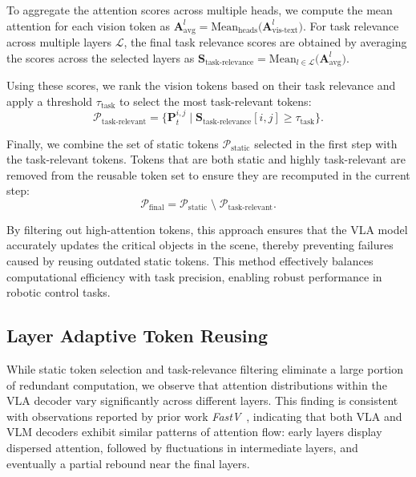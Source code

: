 To aggregate the attention scores across multiple heads, we compute the mean attention for each vision token as $\mathbf{A}^l_{\text{avg}} 
= \mathrm{Mean}_{\text{heads}}\!\bigl(\mathbf{A}^l_{\text{vis-text}}\bigr)$. For task relevance across multiple layers \( \mathcal{L} \), the final task relevance scores are obtained by averaging the scores across the selected layers as $\mathbf{S}_{\text{task-relevance}} 
= \mathrm{Mean}_{l \in \mathcal{L}}\!\bigl(\mathbf{A}^l_{\text{avg}}\bigr)$.

Using these scores, we rank the vision tokens based on their task relevance and apply a threshold \( \tau_{\text{task}} \) to select the most task-relevant tokens:
\begin{equation}
\label{eq:ptask}
\mathcal{P}_{\text{task-relevant}} 
= \{ \mathbf{P}_t^{i,j} \mid \mathbf{S}_{\text{task-relevance}}[i,j] \geq \tau_{\text{task}} \}.
\end{equation}

Finally, we combine the set of static tokens \( \mathcal{P}_{\mathrm{static}} \) selected in the first step with the task-relevant tokens. Tokens that are both static and highly task-relevant are removed from the reusable token set to ensure they are recomputed in the current step:
\begin{equation}
\label{eq:pfinal}
\mathcal{P}_{\mathrm{final}} 
= \mathcal{P}_{\mathrm{static}} \;\setminus\; \mathcal{P}_{\text{task-relevant}}.
\end{equation}

By filtering out high-attention tokens, this approach ensures that the VLA model accurately updates the critical objects in the scene, thereby preventing failures caused by reusing outdated static tokens. This method effectively balances computational efficiency with task precision, enabling robust performance in robotic control tasks.

\subsection{Layer Adaptive Token Reusing}
While static token selection and task-relevance filtering eliminate a large portion of redundant computation, we observe that attention distributions within the VLA decoder vary significantly across different layers. This finding is consistent with observations reported by prior work \textit{FastV}~\cite{chen2025image}, indicating that both VLA and VLM decoders exhibit similar patterns of attention flow: early layers display dispersed attention, followed by fluctuations in intermediate layers, and eventually a partial rebound near the final layers.

